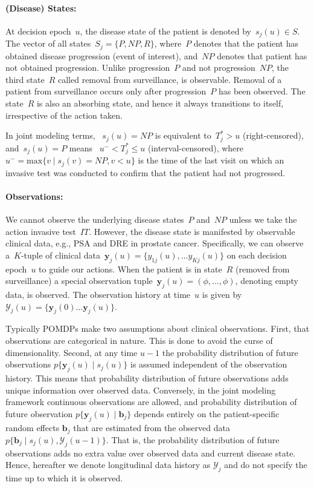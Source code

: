 \begin{subappendices}
\paragraph{\textbf{(Disease) States}:} At decision epoch~$u$, the disease state of the patient is denoted by~$s_j(u) \in S$. The vector of all states~$S_j = \{P, NP, R\}$, where~$P$ denotes that the patient has obtained disease progression (event of interest), and~$NP$ denotes that patient has not obtained progression. Unlike progression~$P$ and not progression~$NP$, the third state~$R$ called removal from surveillance, is observable. Removal of a patient from surveillance occurs only after progression~$P$ has been observed. The state~$R$ is also an absorbing state, and hence it always transitions to itself, irrespective of the action taken. 

In joint modeling terms, ~$s_j(u)=NP$ is equivalent to~$T^*_j > u$ (right-censored), and~$s_j(u) = P$ means ~$u^- < T^*_j \leq u$ (interval-censored), where ${u^- = \mbox{max}\{v \mid s_j(v) = NP, v < u\}}$ is the time of the last visit on which an invasive test was conducted to confirm that the patient had not progressed.

\paragraph{\textbf{Observations}:} We cannot observe the underlying disease states~$P$ and~$NP$ unless we take the action invasive test~$IT$. However, the disease state is manifested by observable clinical data, e.g., PSA and DRE in prostate cancer. Specifically, we can observe a~$K$-tuple of clinical data~$\boldsymbol{y}_j(u) = \{y_{1j}(u),\ldots y_{Kj}(u)\}$ on each decision epoch~$u$ to guide our actions. When the patient is in state~$R$ (removed from surveillance) a special observation tuple~$\boldsymbol{y}_j(u)=(\phi,\ldots,\phi)$, denoting empty data, is observed. The observation history at time~$u$ is given by~${\mathcal{Y}_j(u) = \{\boldsymbol{y}_j(0) \ldots \boldsymbol{y}_j(u)\}}$. 

Typically POMDPs make two assumptions about clinical observations. First, that observations are categorical in nature. This is done to avoid the curse of dimensionality. Second, at any time $u-1$ the probability distribution of future observations $p\{\boldsymbol{y}_j(u) \mid s_j(u)\}$ is assumed independent of the observation history. This means that probability distribution of future observations adds unique information over observed data. Conversely, in the joint modeling framework continuous observations are allowed, and probability distribution of future observation $p\{\boldsymbol{y}_j(u) \mid \boldsymbol{b}_j\}$ depends entirely on the patient-specific random effects $\boldsymbol{b}_j$ that are estimated from the observed data $p\{\boldsymbol{b}_j \mid s_j(u), \mathcal{Y}_j(u-1)\}$. That is, the probability distribution of future observations adds no extra value over observed data and current disease state. Hence, hereafter we denote longitudinal data history as $\mathcal{Y}_j$ and do not specify the time up to which it is observed.


\end{subappendices}
